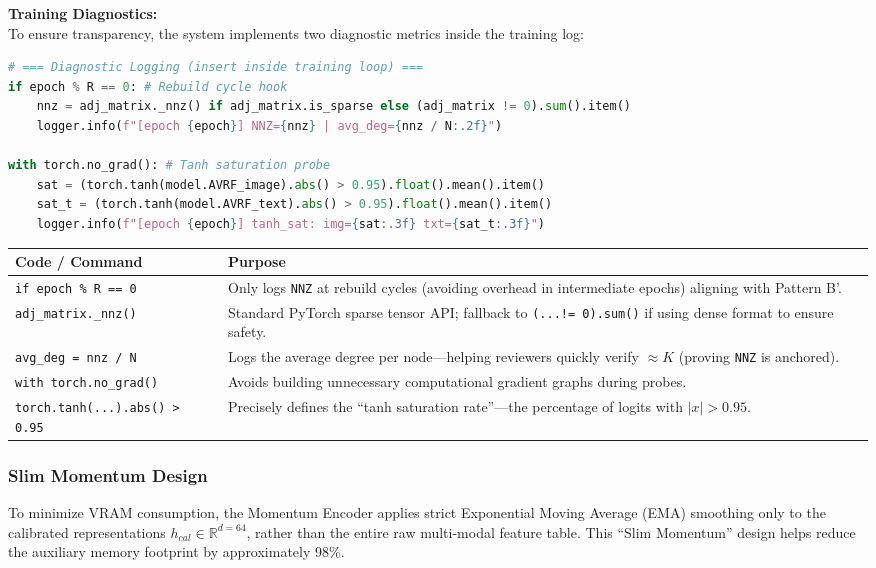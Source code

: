 \documentclass[12pt, a4paper]{article}
\begin{document}
\noindent \textbf{Training Diagnostics:}\\
To ensure transparency, the system implements two diagnostic metrics inside the training log:

\begin{lstlisting}[language=Python, caption=Proposed Diagnostic Logging (insert inside training loop)]
# === Diagnostic Logging (insert inside training loop) ===
if epoch % R == 0: # Rebuild cycle hook
    nnz = adj_matrix._nnz() if adj_matrix.is_sparse else (adj_matrix != 0).sum().item()
    logger.info(f"[epoch {epoch}] NNZ={nnz} | avg_deg={nnz / N:.2f}")

with torch.no_grad(): # Tanh saturation probe
    sat = (torch.tanh(model.AVRF_image).abs() > 0.95).float().mean().item()
    sat_t = (torch.tanh(model.AVRF_text).abs() > 0.95).float().mean().item()
    logger.info(f"[epoch {epoch}] tanh_sat: img={sat:.3f} txt={sat_t:.3f}")
\end{lstlisting}

\begin{table}[htbp]
\centering
\renewcommand{\arraystretch}{1.3}
\begin{tabularx}{\textwidth}{|l|X|}
\hline
\textbf{Code / Command} & \textbf{Purpose} \\
\hline
\texttt{if epoch \% R == 0} & Only logs \texttt{NNZ} at rebuild cycles (avoiding overhead in intermediate epochs) aligning with Pattern B'. \\
\hline
\texttt{adj\_matrix.\_nnz()} & Standard PyTorch sparse tensor API; fallback to \texttt{(...!= 0).sum()} if using dense format to ensure safety. \\
\hline
\texttt{avg\_deg = nnz / N} & Logs the average degree per node---helping reviewers quickly verify $\approx K$ (proving \texttt{NNZ} is anchored). \\
\hline
\texttt{with torch.no\_grad()} & Avoids building unnecessary computational gradient graphs during probes. \\
\hline
\texttt{torch.tanh(...).abs() > 0.95} & Precisely defines the ``tanh saturation rate''---the percentage of logits with $|x| > 0.95$. \\
\hline
\end{tabularx}
\end{table}

\subsubsection{Slim Momentum Design}
To minimize VRAM consumption, the Momentum Encoder applies strict Exponential Moving Average (EMA) smoothing only to the calibrated representations $h_{cal} \in \mathbb{R}^{d=64}$, rather than the entire raw multi-modal feature table. This ``Slim Momentum'' design helps reduce the auxiliary memory footprint by approximately 98\%.
\end{document}

